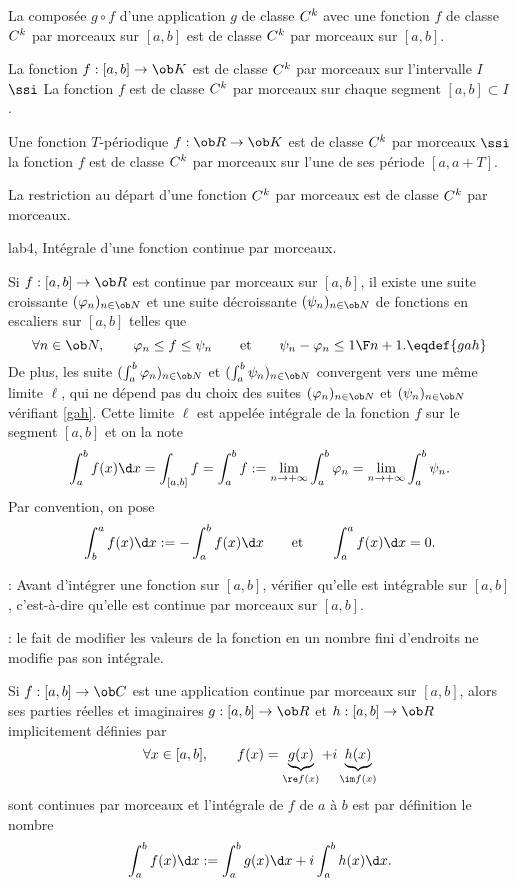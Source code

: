 \Propriete [$a<b$, $k\in\overline{\ob N}$]
La composée $g\circ f$ d'une application $g$ de classe $\sc C^k$ avec une fonction $f$ de classe $\sc C^k$ 
par mor\-ceaux sur $[a,b]$ est de classe $\sc C^k$ par morceaux sur $[a,b]$. 

La fonction $f:[a,b]\to\ob K$ est de classe $\sc C^k$ par morceaux sur l'intervalle $I$ $\ssi $ La fonction $f$ est de classe $\sc C^k$ par morceaux sur chaque segment $[a,b]\subset I$. 

% 

\Definition [$k\in\overline{\ob N}$] 
Une fonction $T$-périodique $f:\ob R\to\ob K$ est de classe $\sc C^k$ par morceaux $\ssi $ la fonction $f$ est de classe $\sc C^k$ par morceaux sur l'une de ses période $[a,a+T]$. 

%

\Propriete [$k\in\overline{\ob N}$]
La restriction au départ d'une fonction $\sc C^k$ par morceaux est de classe $\sc C^k$ par morceaux. 

\Section lab4, Intégrale d'une fonction continue par morceaux. 

\Definition[$a< b$] 
Si $f:[a,b]\to\ob R$ est continue par morceaux sur $[a,b]$, il existe une suite croissante $(\varphi_n)_{n\in\ob N}$ et une suite décroissante $(\psi_n)_{n\in\ob N}$ de fonctions en escaliers sur $[a,b]$ telles que 
$$
\forall n\in\ob N, \qquad \varphi_n\le f\le \psi_n\qquad\mbox{et}\qquad \psi_n-\varphi_n\le {1\F n+1}.\eqdef{gah}
$$
De plus, les suite $(\int_a^b\varphi_n)_{n\in\ob N}$ et $(\int_a^b\psi_n)_{n\in\ob N}$ convergent vers une même limite $\ell$, qui ne dépend pas du choix des suites $(\varphi_n)_{n\in\ob N}$ et $(\psi_n)_{n\in\ob N}$ vérifiant \eqref{gah}. \pn
Cette limite $\ell$ est appelée intégrale de la fonction $f$ sur le segment $[a,b]$ et on la note
$$
\int_a^bf(x)\d x=\int_{[a,b]}f= \int_a^bf:=\lim_{n\to+\infty}\int_a^b\varphi_n=\lim_{n\to+\infty}\int_a^b\psi_n.
$$
Par convention, on pose 
$$
\int_b^af(x)\d x:=-\int_a^bf(x)\d x\qquad \mbox{et}\qquad \int_a^af(x)\d x=0.
$$

\Remarque: Avant d'intégrer une fonction sur $[a,b]$, vérifier qu'elle est intégrable sur $[a,b]$, c'est-à-dire qu'elle est continue par morceaux sur $[a,b]$. 
\bigskip

\Remarque : le fait de modifier les valeurs de la fonction en un nombre fini d'endroits ne modifie pas son intégrale. 
\bigskip

\Definition [$a<b$] 
Si $f:[a,b]\to\ob C$ est une application continue par morceaux sur $[a,b]$, alors ses parties réelles et imaginaires $g:[a,b]\to\ob R$ et $h:[a,b]\to\ob R$ implicitement définies par 
$$
\forall x\in[a,b], \qquad f(x)=\underbrace{g(x)}_{\re f(x)}+i\underbrace{h(x)}_{\im f(x)}
$$
sont continues par morceaux et l'intégrale de $f$ de $a$ à $b$ est par définition le nombre 
$$
\int_a^bf(x)\d x:=\int_a^bg(x)\d x+i\int_a^bh(x)\d x.
$$

